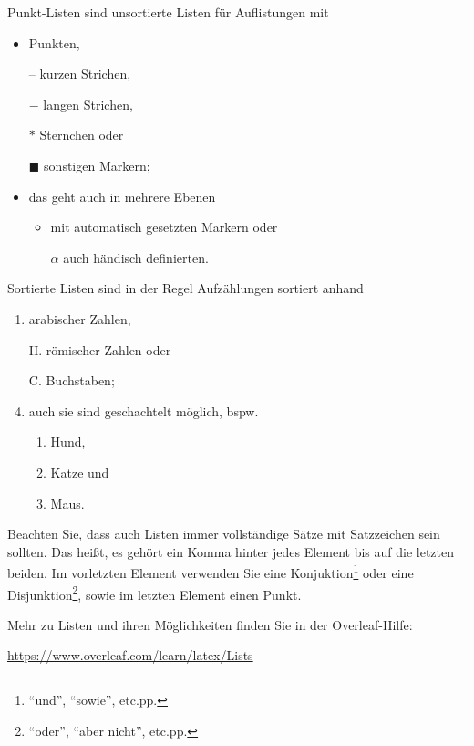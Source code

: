 Punkt-Listen sind unsortierte Listen für Auflistungen mit
\begin{itemize}
    \item Punkten,    
    \item[--] kurzen Strichen,
    \item[$-$] langen Strichen,
    \item[$\ast$] Sternchen oder
    \item[$\blacksquare$] sonstigen Markern;
    \item{
        das geht auch in mehrere Ebenen 
        \begin{itemize}
            \item mit automatisch gesetzten Markern oder
            \item[$\alpha$] auch händisch definierten.
        \end{itemize}
    }
\end{itemize}

Sortierte Listen sind in der Regel Aufzählungen sortiert anhand
\begin{enumerate}
    \item arabischer Zahlen,
    \item[II.] römischer Zahlen oder
    \item[C.] Buchstaben;
    \setcounter{enumi}{3}
    \item{
        auch sie sind geschachtelt möglich, bspw.
        \begin{enumerate}
            \item Hund,
            \item Katze und
            \item Maus.
        \end{enumerate}
    }
\end{enumerate}

Beachten Sie, dass auch Listen immer vollständige Sätze mit Satzzeichen sein sollten. Das heißt, es gehört ein Komma hinter jedes Element bis auf die letzten beiden. Im vorletzten Element verwenden Sie eine Konjuktion\footnote{\enquote{und}, \enquote{sowie}, etc.pp.} oder eine Disjunktion\footnote{\enquote{oder}, \enquote{aber nicht}, etc.pp.}, sowie im letzten Element einen Punkt.

Mehr zu Listen und ihren Möglichkeiten finden Sie in der Overleaf-Hilfe:
\begin{center}
    \url{https://www.overleaf.com/learn/latex/Lists}
\end{center}

